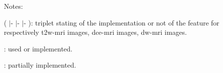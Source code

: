 \begin{table*}
\begin{threeparttable}
\begin{tabular}{p{.5\linewidth} p{.4\linewidth}}
      \hline
    \end{tabular}
    \begin{tablenotes}
      \footnotesize
    \item Notes:
    \item ( {\cmarksmall}$|$- {\cmarksmall}$|$- {\cmarksmall}$|$- ): triplet stating of the implementation or not of the feature for respectively \ac{t2w}-\ac{mri} images, \ac{dce}-\ac{mri} images, \ac{dw}-\ac{mri} images.
    \item {\cmarksmall}: used or implemented.
    \item {\mmarksmall}: partially implemented.
    \end{tablenotes}
  \end{threeparttable}
\end{table*}
\restoregeometry


